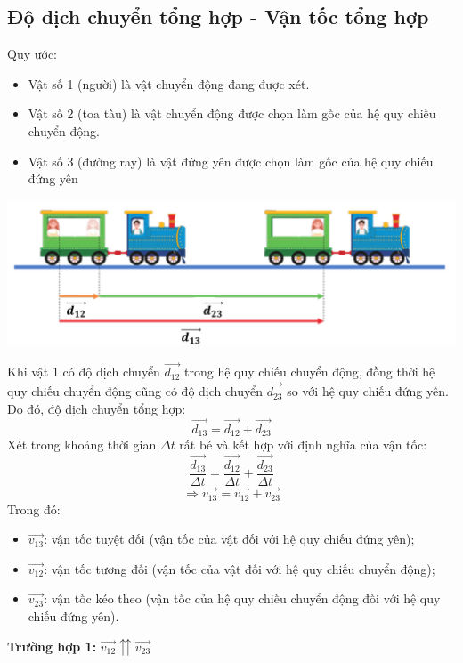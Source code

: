 \subsection{Độ dịch chuyển tổng hợp - Vận tốc tổng hợp}
Quy ước:
\begin{itemize}
	\item Vật số 1 (người) là vật chuyển động đang được xét.
	\item Vật số 2 (toa tàu) là vật chuyển động được chọn làm gốc của hệ quy chiếu chuyển động.
	\item Vật số 3 (đường ray) là vật đứng yên được chọn làm gốc của hệ quy chiếu đứng yên
\end{itemize}
\begin{center}
	\includegraphics[width=0.6\linewidth]{../figs/VN10-2023-PH-TP006-1}
\end{center}
Khi vật 1 có độ dịch chuyển $\overrightarrow{d_{12}}$ trong hệ quy chiếu chuyển động, đồng thời hệ quy chiếu chuyển động cũng có độ dịch chuyển $\overrightarrow{d_{23}}$ so với hệ quy chiếu đứng yên. Do đó, độ dịch chuyển tổng hợp:
$$\overrightarrow{d_{13}}=\overrightarrow{d_{12}}+\overrightarrow{d_{23}}$$
Xét trong khoảng thời gian $\Delta t$ rất bé và kết hợp với định nghĩa của vận tốc:
$$\dfrac{\overrightarrow{d_{13}}}{\Delta t}=\dfrac{\overrightarrow{d_{12}}}{\Delta t}+\dfrac{\overrightarrow{d_{23}}}{\Delta t}$$
$$\Rightarrow \overrightarrow{v_{13}}=\overrightarrow{v_{12}}+\overrightarrow{v_{23}}$$
Trong đó:
\begin{itemize}
	\item $\overrightarrow{v_{13}}$: vận tốc tuyệt đối (vận tốc của vật đối với hệ quy chiếu đứng yên);
	\item $\overrightarrow{v_{12}}$: vận tốc tương đối (vận tốc của vật đối với hệ quy chiếu chuyển động);
	\item $\overrightarrow{v_{23}}$: vận tốc kéo theo (vận tốc của hệ quy chiếu chuyển động đối với hệ quy chiếu đứng yên).
\end{itemize}
\textbf{Trường hợp 1:} $\overrightarrow{v_{12}}\upuparrows \overrightarrow{v_{23}}$
	\begin{center}
	\end{center}
